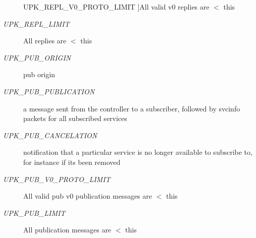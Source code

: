 \begin{Desc}
\begin{description}
{UPK\_\-REPL\_\-V0\_\-PROTO\_\-LIMIT\label{group__client__protocol_ggab04f5fc5314f6296f0ef4b171d1b4282a2eb1a2fa31ca50bb78d16ce51c2c4524}
}]All valid v0 replies are $<$ this \item[{\em 
UPK\_\-REPL\_\-LIMIT\label{group__client__protocol_ggab04f5fc5314f6296f0ef4b171d1b4282a02e71af273f9b7092b8cc2f782f3da5e}
}]All replies are $<$ this \item[{\em 
UPK\_\-PUB\_\-ORIGIN\label{group__client__protocol_ggab04f5fc5314f6296f0ef4b171d1b4282a64e55f7bd2b88ea1d929a5e158b0a64b}
}]pub origin \item[{\em 
UPK\_\-PUB\_\-PUBLICATION\label{group__client__protocol_ggab04f5fc5314f6296f0ef4b171d1b4282a0aca3ba5b1fdb79e07fb737421a3de5e}
}]a message sent from the controller to a subscriber, followed by svcinfo packets for all subscribed services \item[{\em 
UPK\_\-PUB\_\-CANCELATION\label{group__client__protocol_ggab04f5fc5314f6296f0ef4b171d1b4282a3bbda7fcc6c4d7fc4a103003f65a8785}
}]notification that a particular service is no longer available to subscribe to, for instance if its been removed \item[{\em 
UPK\_\-PUB\_\-V0\_\-PROTO\_\-LIMIT\label{group__client__protocol_ggab04f5fc5314f6296f0ef4b171d1b4282a6c36a01a04deabca901ce631c8975f52}
}]All valid pub v0 publication messages are $<$ this \item[{\em 
UPK\_\-PUB\_\-LIMIT\label{group__client__protocol_ggab04f5fc5314f6296f0ef4b171d1b4282a8c483e1fbf3bcff3358549d3fbc0e236}
}]All publication messages are $<$ this \end{description}
\end{Desc}

